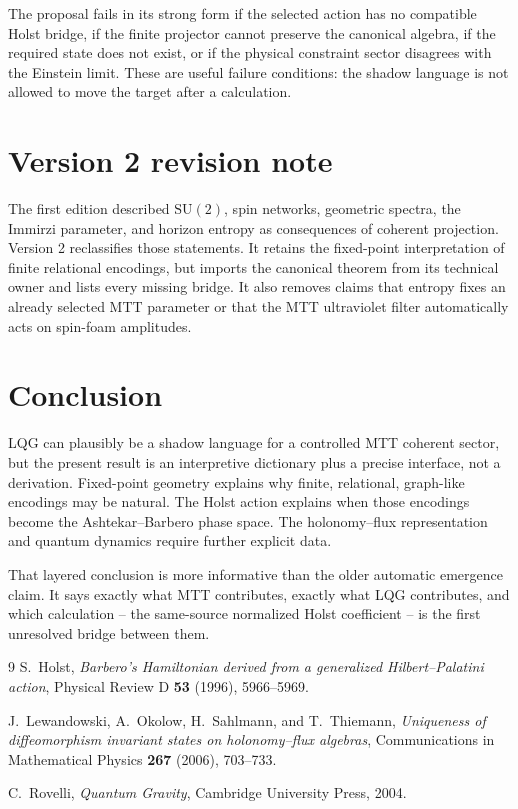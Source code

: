 \documentclass[11pt]{article}
\begin{document}
The proposal fails in its strong form if the selected action has no compatible
Holst bridge, if the finite projector cannot preserve the canonical algebra,
if the required state does not exist, or if the physical constraint sector
disagrees with the Einstein limit. These are useful failure conditions: the
shadow language is not allowed to move the target after a calculation.

\section{Version 2 revision note}

The first edition described \(\mathrm{SU}(2)\), spin networks, geometric
spectra, the Immirzi parameter, and horizon entropy as consequences of
coherent projection. Version 2 reclassifies those statements. It retains the
fixed-point interpretation of finite relational encodings, but imports the
canonical theorem from its technical owner and lists every missing bridge.
It also removes claims that entropy fixes an already selected MTT parameter
or that the MTT ultraviolet filter automatically acts on spin-foam
amplitudes.

\section{Conclusion}

LQG can plausibly be a shadow language for a controlled MTT coherent sector,
but the present result is an interpretive dictionary plus a precise
interface, not a derivation. Fixed-point geometry explains why finite,
relational, graph-like encodings may be natural. The Holst action explains
when those encodings become the Ashtekar--Barbero phase space. The
holonomy--flux representation and quantum dynamics require further explicit
data.

That layered conclusion is more informative than the older automatic
emergence claim. It says exactly what MTT contributes, exactly what LQG
contributes, and which calculation -- the same-source normalized Holst
coefficient -- is the first unresolved bridge between them.

\begin{thebibliography}{9}
S.~Holst,
\emph{Barbero's Hamiltonian derived from a generalized Hilbert--Palatini
action},
Physical Review D \textbf{53} (1996), 5966--5969.

J.~Lewandowski, A.~Okolow, H.~Sahlmann, and T.~Thiemann,
\emph{Uniqueness of diffeomorphism invariant states on holonomy--flux
algebras},
Communications in Mathematical Physics \textbf{267} (2006), 703--733.

C.~Rovelli,
\emph{Quantum Gravity},
Cambridge University Press, 2004.
\end{thebibliography}
\end{document}
